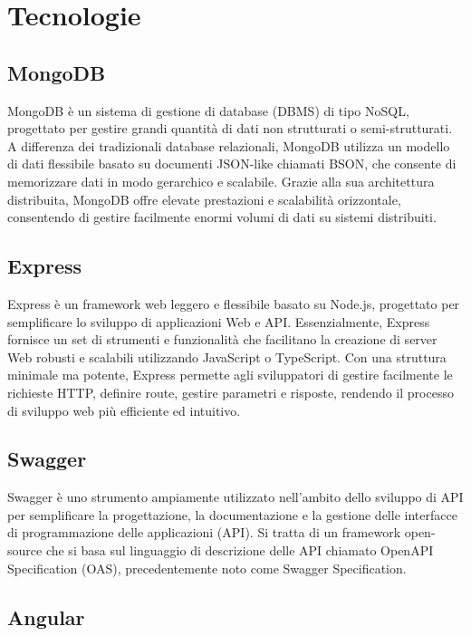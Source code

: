 \chapter{Tecnologie}

\section{MongoDB}

MongoDB è un sistema di gestione di database (DBMS) di tipo NoSQL, progettato per gestire grandi quantità di dati non strutturati o semi-strutturati. A differenza dei tradizionali database relazionali, MongoDB utilizza un modello di dati flessibile basato su documenti JSON-like chiamati BSON, che consente di memorizzare dati in modo gerarchico e scalabile. Grazie alla sua architettura distribuita, MongoDB offre elevate prestazioni e scalabilità orizzontale, consentendo di gestire facilmente enormi volumi di dati su sistemi distribuiti.

\section{Express}

Express è un framework web leggero e flessibile basato su Node.js, progettato per semplificare lo sviluppo di applicazioni Web e API. Essenzialmente, Express fornisce un set di strumenti e funzionalità che facilitano la creazione di server Web robusti e scalabili utilizzando JavaScript o TypeScript. Con una struttura minimale ma potente, Express permette agli sviluppatori di gestire facilmente le richieste HTTP, definire route, gestire parametri e risposte, rendendo il processo di sviluppo web più efficiente ed intuitivo.

\section{Swagger}

Swagger è uno strumento ampiamente utilizzato nell'ambito dello sviluppo di API per semplificare la progettazione, la documentazione e la gestione delle interfacce di programmazione delle applicazioni (API). Si tratta di un framework open-source che si basa sul linguaggio di descrizione delle API chiamato OpenAPI Specification (OAS), precedentemente noto come Swagger Specification.

\section{Angular}

